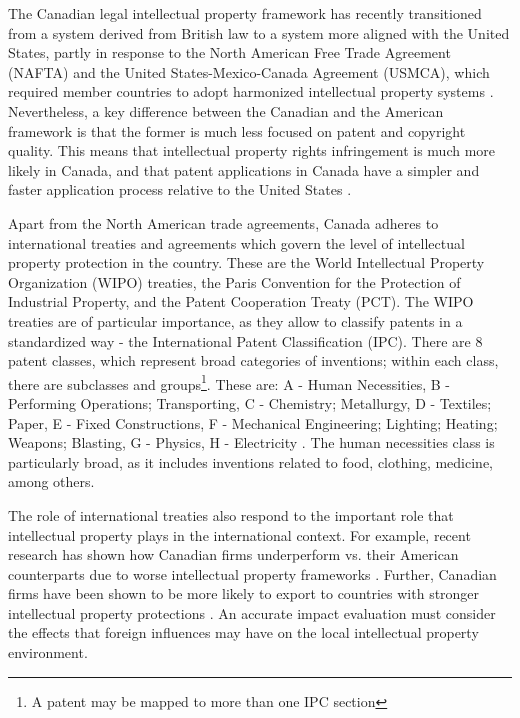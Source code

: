 \documentclass[../main.tex]{subfiles}
\begin{document}



The Canadian legal intellectual property framework has recently transitioned from a system derived from British law to a system more aligned with the United States, partly in response to the North American Free Trade Agreement (NAFTA) and the United States-Mexico-Canada Agreement (USMCA), which required member countries to adopt harmonized intellectual property systems \parencite{putnam06}. Nevertheless, a key difference between the Canadian and the American framework is that the former is much less focused on patent and copyright quality. This means that intellectual property rights infringement is much more likely in Canada, and that patent applications in Canada have a simpler and faster application process relative to the United States \parencite{vaver06}. 


Apart from the North American trade agreements, Canada adheres to international treaties and agreements which govern the level of intellectual property protection in the country. These are the World Intellectual Property Organization (WIPO) treaties, the Paris Convention for the Protection of Industrial Property, and the Patent Cooperation Treaty (PCT). The WIPO treaties are of particular importance, as they allow to classify patents in a standardized way - the International Patent Classification (IPC). There are 8 patent classes, which represent broad categories of inventions; within each class, there are subclasses and groups\footnote{A patent may be mapped to more than one IPC section}. These are: A - Human Necessities, B - Performing Operations; Transporting, C - Chemistry; Metallurgy, D - Textiles; Paper, E - Fixed Constructions, F - Mechanical Engineering; Lighting; Heating; Weapons; Blasting, G - Physics, H - Electricity \parencite{worldintellectualpropertyorganization24}. The human necessities class is particularly broad, as it includes inventions related to food, clothing, medicine, among others. 
 
The role of international treaties also respond to the important role that intellectual property plays in the international context. For example, recent research has shown how Canadian firms underperform vs. their American counterparts due to worse intellectual property frameworks \parencite{carew_etal06}. Further, Canadian firms have been shown to be more likely to export to countries with stronger intellectual property protections \parencite{rafiquzzaman02}. An accurate impact evaluation must consider the effects that foreign influences may have on the local intellectual property environment.
\end{document}
